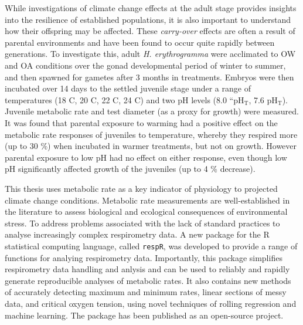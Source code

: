 While investigations of climate change effects at the adult stage provides insights into the resilience of established populations, it is also important to understand how their offspring may be affected.
These \emph{carry-over} effects are often a result of parental environments and have been found to occur quite rapidly between generations.
To investigate this, adult \textit{H. erythrogramma} were acclimated to OW and OA conditions over the gonad developmental period of winter to summer, and then spawned for gametes after 3 months in treatments. 
Embryos were then incubated over 14 days to the settled juvenile stage under a range of temperatures (18 \degree C, 20 \degree C, 22 \degree C, 24 \degree C) and two pH levels (8.0 ``$\mathrm{pH_T}$, 7.6 $\mathrm{pH_T}$).
Juvenile metabolic rate and test diameter (as a proxy for growth) were measured.
It was found that parental exposure to warming had a positive effect on the metabolic rate responses of juveniles to temperature, whereby they respired more (up to 30 \%) when incubated in warmer treatments, but not on growth.
However parental exposure to low pH had no effect on either response, even though low pH significantly affected growth of the juveniles (up to 4 \% decrease).

This thesis uses metabolic rate as a key indicator of physiology to projected climate change conditions.
Metabolic rate measurements are well-established in the literature to assess biological and ecological consequences of environmental stress. 
To address problems associated with the lack of standard practices to analyse increasingly complex respirometry data. 
A new package for the R statistical computing language, called \texttt{respR}, was developed to provide a range of functions for analying respirometry data.
Importantly, this package simplifies respirometry data handling and anlysis and can be used to reliably and rapidly generate reproducible analyses of metabolic rates.
It also contains new methods of accurately detecting maximum and minimum rates, linear sections of messy data, and critical oxygen tension, using novel techniques of rolling regression and machine learning.
The package has been published as an open-source project.



